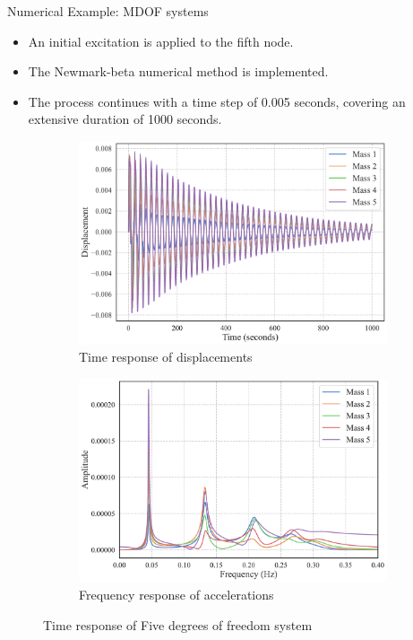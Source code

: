 \documentclass{beamer}
\begin{document}
\begin{frame}{Numerical Example: MDOF systems}
\begin{itemize}
  \item An initial excitation is applied to the fifth node.
  \item The Newmark-beta numerical method is implemented.
  \item The process continues with a time step of 0.005 seconds, covering an extensive duration of 1000 seconds.
\end{itemize}

  \begin{figure}[!ht]
    \centering
    \begin{subfigure}{0.45\textwidth}
        \centering
        \includegraphics[width=\textwidth]{displacements_visualization.pdf}
        \caption{Time response of displacements}
    \end{subfigure}
    \hspace{2em}%
    \begin{subfigure}{0.45\textwidth}
        \centering
        \includegraphics[width=\textwidth]{frequency_visualization.pdf}
        \caption{Frequency response of accelerations}
    \end{subfigure}
    \caption{Time response of Five degrees of freedom system}
    \label{fig:12}%
  \end{figure}
\end{frame}
\end{document}
